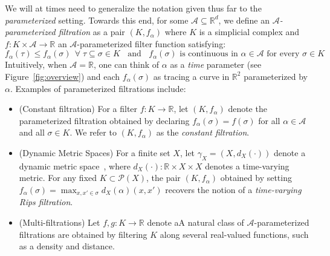 We will at times need to generalize the notation given thus far to the \emph{parameterized} setting. Towards this end, for some $\mathcal{A} \subseteq \mathbb{R}^d$, we define an \emph{$\mathcal{A}$-parameterized filtration} as a pair $(K, f_\alpha)$ where $K$ is a simplicial complex and $f : K \times \mathcal{A} \to \mathbb{R}$ an $\mathcal{A}$-parameterized filter function satisfying:
\begin{equation}
f_\alpha(\tau) \leq f_\alpha(\sigma) \;\, \forall \; \tau \subseteq \sigma \in K  \;\; \text{ and } \; \; f_\alpha(\sigma) \text{ is continuous in } \alpha \in \mathcal{A} \text{ for every } \sigma \in K
\end{equation}
Intuitively, when $\mathcal{A} = \mathbb{R}$, one can think of $\alpha$ as a \emph{time} parameter (see Figure~\ref{fig:overview}) and each $f_\alpha(\sigma)$ as tracing a curve in $\mathbb{R}^2$ parameterized by $\alpha$.  
Examples of parameterized filtrations include:
\begin{itemize}[itemsep=0.25em, parsep=0.25em]
	\item (Constant filtration) For a filter $f : K \to \mathbb{R}$, let $(K, f_\alpha)$ denote the parameterized filtration obtained by declaring $f_\alpha(\sigma) = f(\sigma)$ for all $\alpha \in \mathcal{A}$ and all $\sigma \in K$. We refer to $(K, f_\alpha)$ as the \emph{constant filtration}. 
	\item (Dynamic Metric Spaces) For a finite set $X$, let $\gamma_X = (X, d_X(\cdot))$ denote a dynamic metric space~\cite{kim2021spatiotemporal}, where $d_X(\cdot) : \mathbb{R} \times X \times X$ denotes a time-varying metric. For any fixed $K \subset \mathcal{P}(X)$, the pair $(K, f_\alpha)$ obtained by setting $f_\alpha(\sigma) = \max_{x, x' \in \sigma} d_X(\alpha)(x,x')$ recovers the notion of a \emph{time-varying Rips filtration}.
	\item (Multi-filtrations) Let $f, g: K \to \mathbb{R}$ denote aA natural class of $\mathcal{A}$-parameterized filtrations are obtained by filtering $K$ along several real-valued functions, such as a density and distance.
\end{itemize} 


